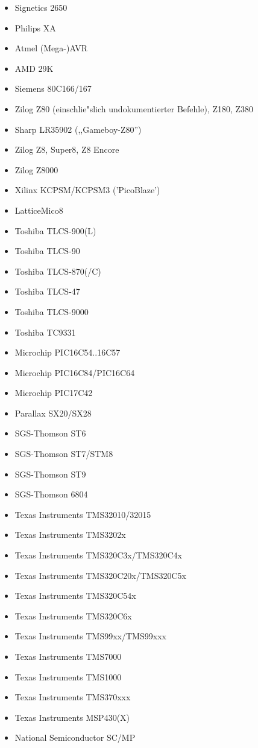 \documentclass[12pt,a4paper,twoside]{report}
\begin{document}
\begin{itemize}
\item{Signetics 2650}
\item{Philips XA}
\item{Atmel (Mega-)AVR}
\item{AMD 29K}
\item{Siemens 80C166/167}
\item{Zilog Z80 (einschlie"slich undokumentierter Befehle), Z180, Z380}
\item{Sharp LR35902 (,,Gameboy-Z80'')}
\item{Zilog Z8, Super8, Z8 Encore}
\item{Zilog Z8000}
\item{Xilinx KCPSM/KCPSM3 ('PicoBlaze')}
\item{LatticeMico8}
\item{Toshiba TLCS-900(L)}
\item{Toshiba TLCS-90}
\item{Toshiba TLCS-870(/C)}
\item{Toshiba TLCS-47}
\item{Toshiba TLCS-9000}
\item{Toshiba TC9331}
\item{Microchip PIC16C54..16C57}
\item{Microchip PIC16C84/PIC16C64}
\item{Microchip PIC17C42}
\item{Parallax SX20/SX28}
\item{SGS-Thomson ST6}
\item{SGS-Thomson ST7/STM8}
\item{SGS-Thomson ST9}
\item{SGS-Thomson 6804}
\item{Texas Instruments TMS32010/32015}
\item{Texas Instruments TMS3202x}
\item{Texas Instruments TMS320C3x/TMS320C4x}
\item{Texas Instruments TMS320C20x/TMS320C5x}
\item{Texas Instruments TMS320C54x}
\item{Texas Instruments TMS320C6x}
\item{Texas Instruments TMS99xx/TMS99xxx}
\item{Texas Instruments TMS7000}
\item{Texas Instruments TMS1000}
\item{Texas Instruments TMS370xxx}
\item{Texas Instruments MSP430(X)}
\item{National Semiconductor SC/MP}

\end{itemize}
\end{document}
